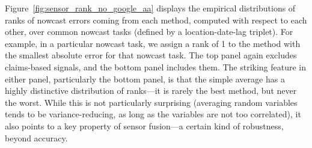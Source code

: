 \documentclass[sts]{imsart}
\theoremstyle{plain}
\theoremstyle{definition}
\theoremstyle{remark}
\begin{document}
Figure~\ref{fig:sensor_rank_no_google_aa} displays the empirical distributions
of ranks of nowcast errors coming from each method, computed with respect to
each other, over common nowcast tasks (defined by a location-date-lag
triplet). For example, in a particular nowcast task, we assign a rank of 1 to
the method with the smallest absolute error for that nowcast task. The top panel
again excludes claims-based signals, and the bottom panel includes them. The
striking feature in either panel, particularly the bottom panel, is that the
simple average has a highly distinctive distribution of ranks---it is rarely the
best method, but never the worst. While this is not particularly surprising
(averaging random variables tends to be variance-reducing, as long as the
variables are not too correlated), it also points to a key property of sensor
fusion---a certain kind of robustness, beyond accuracy.
\end{document}
